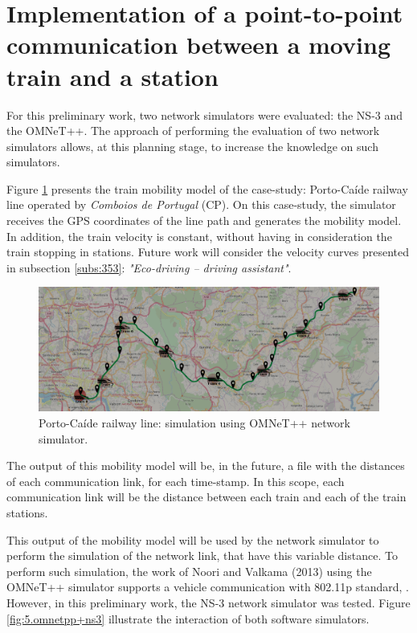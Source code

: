 \section{Implementation of a point-to-point communication between a moving train and a station}

For this preliminary work, two network simulators were evaluated: the NS-3 and the OMNeT++. The approach of performing the evaluation of two network simulators allows, at this planning stage, to increase the knowledge on such simulators.

Figure \ref{fig:5.porto-caide} presents the train mobility model of the case-study: Porto-Caíde railway line operated by \textit{Comboios de Portugal} (CP). On this case-study, the simulator receives the \ac{GPS} coordinates of the line path and generates the mobility model. In addition, the train velocity is constant, without having in consideration the train stopping in stations. Future work will consider the velocity curves presented in subsection \ref{subs:353}: \textit{"Eco-driving – driving assistant"}.


\begin{figure}[h!]
	\centering
	\includegraphics[width=\textwidth,keepaspectratio]{figures/50.PreliminaryW/porto-caide2}
	\caption{Porto-Caíde railway line: simulation using OMNeT++ network simulator.}
	\label{fig:5.porto-caide}
\end{figure}


The output of this mobility model will be, in the future, a file with the distances of each communication link, for each time-stamp. In this scope, each communication link will be the distance between each train and each of the train stations.

This output of the mobility model will be used by the network simulator to perform the simulation of the network link, that have this variable distance. To perform such simulation, the work of Noori and Valkama (2013) using the OMNeT++ simulator supports a vehicle communication with 802.11p standard, \cite{noori2013}. However, in this preliminary work, the NS-3 network simulator was tested. Figure \ref{fig:5.omnetpp+ns3} illustrate the interaction of both software simulators.

